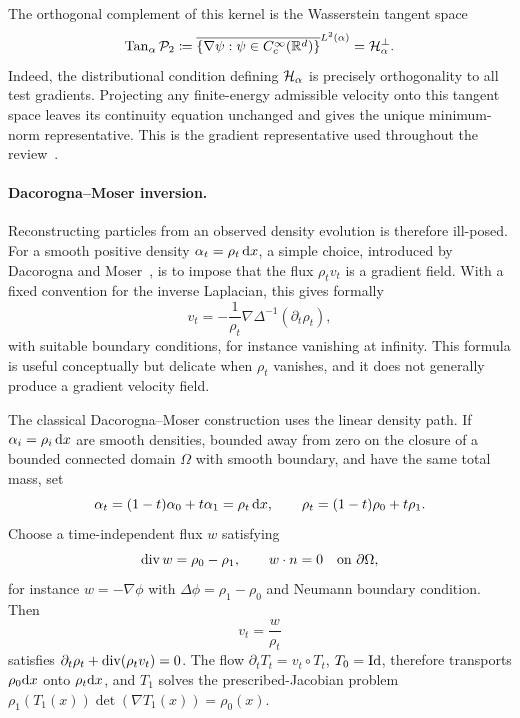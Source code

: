 The orthogonal complement of this kernel is the Wasserstein tangent space
\begin{equation}\label{eq-wasserstein-tangent-space}
\operatorname{Tan}_\alpha\mathcal{P}_2
\coloneqq\overline{\{\nabla\psi:\psi\in C_c^\infty(\mathbb{R}^d)\}}^{L^2(\alpha)}
=\mathcal{H}_\alpha^\perp.
\end{equation}
Indeed, the distributional condition defining $\mathcal{H}_\alpha$ is precisely orthogonality to all test gradients. Projecting any finite-energy admissible velocity onto this tangent space leaves its continuity equation unchanged and gives the unique minimum-norm representative. This is the gradient representative used throughout the review~\citep{ambrosio2006gradient}.

\paragraph{Dacorogna--Moser inversion.}

Reconstructing particles from an observed density evolution is therefore ill-posed. For a smooth positive density $\alpha_t=\rho_t\,\mathrm{d} x$, a simple choice, introduced by Dacorogna and Moser~\citep{DacorognaMoser1990}, is to impose that the flux $\rho_t v_t$ is a gradient field. With a fixed convention for the inverse Laplacian, this gives formally
\begin{equation}\label{eq:dacorogna-moser}
	v_t=-\frac{1}{\rho_t}\nabla\Delta^{-1}(\partial_t\rho_t),
\end{equation}
with suitable boundary conditions, for instance vanishing at infinity. This formula is useful conceptually but delicate when $\rho_t$ vanishes, and it does not generally produce a gradient velocity field.

The classical Dacorogna--Moser construction uses the linear density path. If $\alpha_i=\rho_i\,\mathrm{d} x$ are smooth densities, bounded away from zero on the closure of a bounded connected domain $\Omega$ with smooth boundary, and have the same total mass, set
\[
	\alpha_t=(1-t)\alpha_0+t\alpha_1=\rho_t\,\mathrm{d} x,
	\qquad
	\rho_t=(1-t)\rho_0+t\rho_1.
\]
Choose a time-independent flux $w$ satisfying
\[
	\operatorname{div} w=\rho_0-\rho_1,
	\qquad
	w\cdot n=0\quad\hbox{on }\partial\Omega,
\]
for instance $w=-\nabla\phi$ with $\Delta\phi=\rho_1-\rho_0$ and Neumann boundary condition. Then
\[
	v_t=\frac{w}{\rho_t}
\]
satisfies $\partial_t\rho_t+\operatorname{div}(\rho_t v_t)=0$. The flow
$\partial_t T_t=v_t\circ T_t$, $T_0=\mathrm{Id}$, therefore transports
$\rho_0\mathrm{d} x$ onto $\rho_t\mathrm{d} x$, and $T_1$ solves the prescribed-Jacobian problem
$\rho_1(T_1(x))\det(\nabla T_1(x))=\rho_0(x)$.

